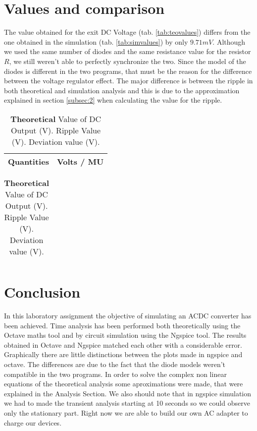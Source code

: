 \vspace{-5mm}
\section{Values and comparison}


The value obtained for the exit DC Voltage (tab. \ref{tab:teovalues}) differs from the one obtained in the simulation 
(tab. \ref{tab:simvalues}) by only $9.71 mV$. Although we used the same number of diodes and the same resistance value for
 the resistor $R$, we still weren't able to perfectly synchronize the two. Since the model of the diodes is different in 
 the two programs, that must be the reason for the difference between the voltage regulator effect. The major difference
 is between the ripple in both theoretical and simulation analysis and this is due to the approximation explained in section
  \ref{subsec:2} when calculating the value for the ripple.

 \vspace{5mm}
 \begin{table}[h]
    \parbox{.45\linewidth}{
    \centering
    \begin{tabular}{|c|c|}
        \hline    
        {\bf Quantities} & {\bf Volts / MU} \\ \hline
        
    \end{tabular}
    \vspace{-2mm}
    \caption{{\bf{Simulation}} Average Voltage Value of DC Output (V). Deviation value (V). Ripple Value (Max-Min) (V). Cost of Circuit (MU). Merit of Circuit.}
    \label{ngspice}
    }
    \hfill
    \parbox{.45\linewidth}{
    \centering
    \begin{tabular}{|c|c|}
        \hline
      
    \end{tabular}
    \vspace{-2mm}
    \caption{{\bf{Theoretical}} Value of DC Output (V). Ripple Value (V). Deviation value (V). }
    \label{analise teorica - ponto 2}
    }
\end{table}

\section{Conclusion}
\label{sec:conclusion}
\vspace{10mm}
In this laboratory assignment the objective of simulating an ACDC converter has been achieved. 
Time analysis has been performed both
theoretically using the Octave maths tool and by circuit simulation using the
Ngspice tool.
The results obtained in Octave and Ngspice matched each other with a considerable error. 
Graphically there are little distinctions between the plots made in ngspice and octave.
The differences are due to the fact that
the diode models weren't compatible in the two programs.
In order to solve the complex non linear equations of the theoretical analysis some aproximations were made,
that were explained in the Analysis Section.
We also should note that in ngspice simulation we had to made the transient analysis starting at 10 seconds
so we could observe only the stationary part.
Right now we are able to build our own AC adapter to charge our devices.
